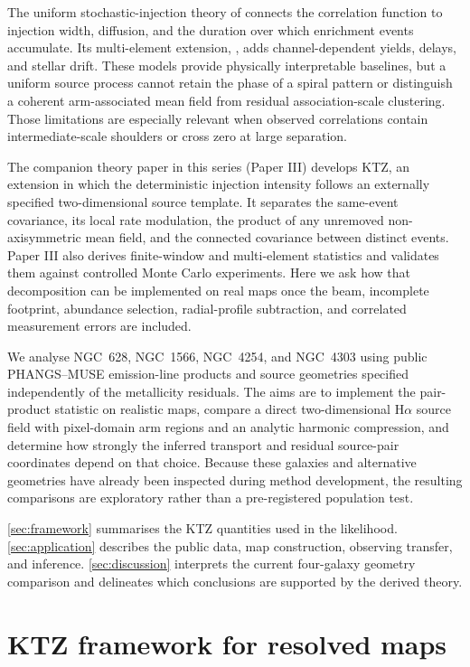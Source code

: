 \documentclass[fleqn,usenatbib]{mnras}
\begin{document}
The uniform stochastic-injection theory of \citet[hereafter ]{KT18} connects the correlation function to injection width, diffusion, and the duration over which enrichment events accumulate.  Its multi-element extension, \citet[hereafter ]{KT25}, adds channel-dependent yields, delays, and stellar drift.  These models provide physically interpretable baselines, but a uniform source process cannot retain the phase of a spiral pattern or distinguish a coherent arm-associated mean field from residual association-scale clustering.  Those limitations are especially relevant when observed correlations contain intermediate-scale shoulders or cross zero at large separation.

The companion theory paper in this series (Paper III) develops KTZ, an extension in which the deterministic injection intensity follows an externally specified two-dimensional source template.  It separates the same-event covariance, its local rate modulation, the product of any unremoved non-axisymmetric mean field, and the connected covariance between distinct events.  Paper III also derives finite-window and multi-element statistics and validates them against controlled Monte Carlo experiments.  Here we ask how that decomposition can be implemented on real maps once the beam, incomplete footprint, abundance selection, radial-profile subtraction, and correlated measurement errors are included.

We analyse NGC~628, NGC~1566, NGC~4254, and NGC~4303 using public PHANGS--MUSE emission-line products and source geometries specified independently of the metallicity residuals.  The aims are to implement the pair-product statistic on realistic maps, compare a direct two-dimensional H$\alpha$ source field with pixel-domain arm regions and an analytic harmonic compression, and determine how strongly the inferred transport and residual source-pair coordinates depend on that choice.  Because these galaxies and alternative geometries have already been inspected during method development, the resulting comparisons are exploratory rather than a pre-registered population test.

\autoref{sec:framework} summarises the KTZ quantities used in the likelihood.  \autoref{sec:application} describes the public data, map construction, observing transfer, and inference.  \autoref{sec:discussion} interprets the current four-galaxy geometry comparison and delineates which conclusions are supported by the derived theory.

\section{KTZ framework for resolved maps}
\label{sec:framework}
\end{document}

